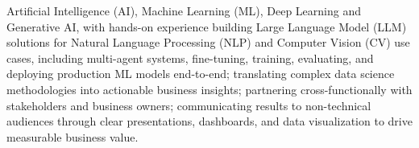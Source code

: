 \begin{itemize}
        Artificial Intelligence (AI), Machine Learning (ML), Deep Learning and Generative AI, with hands-on
        experience building Large Language Model (LLM) solutions for Natural Language Processing (NLP) and
        Computer Vision (CV) use cases, including multi-agent systems, fine-tuning, training, evaluating, and
        deploying production ML models end-to-end; translating complex data science methodologies into
        actionable business insights; partnering cross-functionally with stakeholders and business owners;
        communicating results to non-technical audiences through clear presentations, dashboards, and data
        visualization to drive measurable business value.
\end{itemize}
